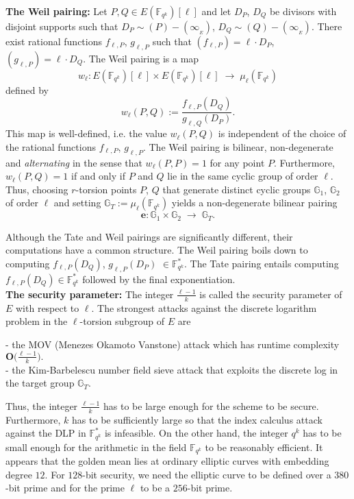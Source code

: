 \documentclass[a4paper, 11pt]{scrreprt}
\numberwithin{equation}{section}
\newcommand{\bF}{\mathbb F}
\newcommand{\bFqk}{\mathbb{F}_{q^k}}
\newcommand{\bG}{\mathbb{G}}
\newcommand{\lra}{\longrightarrow}
\newcommand{\mb}{\mathbb}
\newcommand{\mbf}{\mathbf}
\newcommand{\e}{\mathbf{e}}
\newcommand{\vs}{\vspace{-2mm}}
\newcommand{\noin}{\noindent}
\theoremstyle{plain}
\begin{document}
    
\bigskip



\noin \textbf{The Weil pairing:} Let $P, Q \in E(\bFqk)[\ell]$ and let $D_P$, $D_Q$ be divisors with disjoint supports such that $D_P \sim (P) - (\infty_{_E}) $, $D_Q \sim (Q) - (\infty_{_E}) $. There exist rational functions $f_{\ell,P}$, $g_{\ell,P}$ such that $(f_{\ell,P}) = \ell \cdot D_P$, $(g_{\ell,P}) = \ell \cdot D_Q$. The Weil pairing is a map \vs $$w_{\ell}: E(\bFqk)[\ell]\times E(\bFqk)[\ell]\;\lra \; \mu_{\ell}(\bFqk) $$ defined by \vs $$w_{\ell}(P,Q):= \frac{f_{\ell,P}(D_Q)}{g_{\ell,Q}(D_P)}. $$ This map is well-defined, i.e. the value $w_{\ell}(P,Q)$ is independent of the choice of the rational functions $f_{\ell,P}$, $g_{\ell,P}$. The Weil pairing is bilinear, non-degenerate and \textit{alternating} in the sense that $w_{\ell}(P,P) = 1$ for any point $P$. Furthermore, $w_{\ell}(P,Q) = 1$ if and only if $P$ and $Q$ lie in the same cyclic group of order $\ell$. Thus, choosing $r$-torsion points $P$, $Q$ that generate distinct cyclic groups $\mb{G}_1$, $\mb{G}_2$ of order $\ell$ and setting $\mb{G}_T:= \mu_{\ell}(\bFqk)$ yields a non-degenerate bilinear pairing \vs $$\e: \mb{G}_1\times\mb{G}_2 \;\lra\; \mb{G}_T . $$    

Although the Tate and Weil pairings are significantly different, their computations have a common structure. The Weil pairing boils down to computing $f_{\ell,P}(D_Q)$, $g_{\ell,P}(D_P)$ $\in \bFqk^*$. The Tate pairing entails computing $f_{\ell,P}(D_Q)\in \bFqk^*$ followed by the final exponentiation.\\


\noin \textbf{The security parameter:} The integer $\frac{\ell-1}{k}$ is called the security parameter of $E$ with respect to $\ell$. The strongest attacks against the discrete logarithm problem in the $\ell$-torsion subgroup of $E$ are 

\noin - the MOV (Menezes Okamoto Vanstone) attack which has runtime complexity $\mbf{O}\big(\frac{\ell-1}{k}).$ \\
- the Kim-Barbelescu number field sieve attack that exploits the discrete log in the target group $\bG_T$.

Thus, the integer $\frac{\ell-1}{k}$ has to be large enough for the scheme to be secure. Furthermore, $k$ has to be sufficiently large so that the index calculus attack against the DLP in $\bFqk^*$ is infeasible. On the other hand, the integer $q^k$ has to be small enough for the arithmetic in the field $\bF _{q^k}$ to be reasonably efficient. It appears that the golden mean  lies at ordinary elliptic curves with embedding degree $12$. For $128$-bit security, we need the elliptic curve to be defined over a $380$-bit prime and for the prime $\ell$ to be a $256$-bit prime.  
\end{document}

